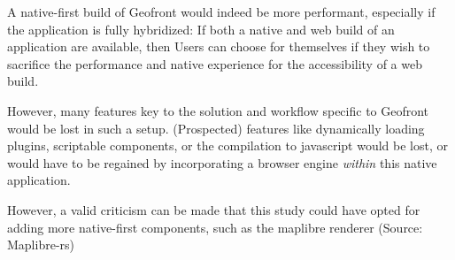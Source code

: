 A native-first build of Geofront would indeed be more performant, especially if the application is fully hybridized:
If both a native and web build of an application are available, then Users can choose for themselves if they wish to sacrifice the performance and native experience for the accessibility of a web build. 
 
However, many features key to the solution and workflow specific to Geofront would be lost in such a setup.  
(Prospected) features like dynamically loading plugins, scriptable components, or the compilation to javascript would be lost, or would have to be regained by incorporating a browser engine \emph{within} this native application. 

However, a valid criticism can be made that this study could have opted for adding more native-first components, such as the maplibre renderer (Source: Maplibre-rs)










